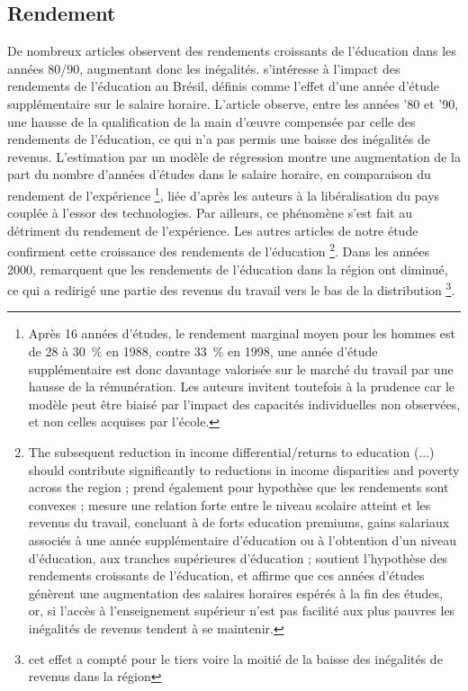\documentclass[pagesize, twoside=off, bibliography=totoc, DIV=calc, fontsize=12pt, a4paper, french]{scrartcl}
\begin{document}
\subsection{Rendement}

\label{sec_rendement}

De nombreux articles observent des rendements croissants de l’éducation dans les années 80/90, augmentant donc les inégalités. 
 s’intéresse à l’impact des rendements de l’éducation au Brésil, définis comme l’effet d’une année d’étude supplémentaire sur le salaire horaire. L’article observe, entre les années ’80 et ’90, une hausse de la qualification de la main d’œuvre compensée par celle des rendements de l’éducation, ce qui n’a pas permis une baisse des inégalités de revenus. 
L’estimation par un modèle de régression montre une augmentation de la part du nombre d’années d’études dans le salaire horaire, en comparaison du rendement de l’expérience 
\footnote{Après 16 années d'études, le rendement marginal moyen pour les hommes est de 28 à \SI{30}{\percent} en 1988, contre \SI{33}{\percent} en 1998, une année d’étude supplémentaire est donc davantage valorisée sur le marché du travail par une hausse de la rémunération. Les auteurs invitent toutefois à la prudence car le modèle peut être biaisé par l’impact des capacités individuelles non observées, et non celles acquises par l’école.}, 
liée d’après les auteurs à la libéralisation du pays couplée à l’essor des technologies. 
Par ailleurs, ce phénomène s’est fait au détriment du rendement de l’expérience. Les autres articles de notre étude confirment cette croissance des rendements de l’éducation \footnote{\og{}The subsequent reduction in income differential/returns to education (...) should contribute significantly to reductions in income disparities and poverty across the region\fg{} \citep{psacharopoulos_poverty_1995}; \citet{ferreira_rise_2008} prend également pour hypothèse que les rendements sont convexes ; \citet{carlson_education_2002} mesure une relation forte entre le niveau scolaire atteint et les revenus du travail, concluant à de forts \og{}education premiums\fg{}, gains salariaux associés à une année supplémentaire d’éducation ou à l’obtention d’un niveau d’éducation, aux tranches supérieures d’éducation ; \citet{urbina_intergenerational_2018} soutient l’hypothèse des rendements croissants de l’éducation, et affirme que ces années d’études génèrent une augmentation des salaires horaires espérés à la fin des études, or, si l’accès à l’enseignement supérieur n’est pas facilité aux plus pauvres les inégalités de revenus tendent à se maintenir.}. Dans les années 2000, \citet{levy_latin_2013} remarquent que les rendements de l’éducation dans la région ont diminué, ce qui a redirigé une partie des revenus du travail vers le bas de la distribution \footnote{cet effet a compté pour le tiers voire la moitié de la baisse des inégalités de revenus dans la région}.
\end{document}
